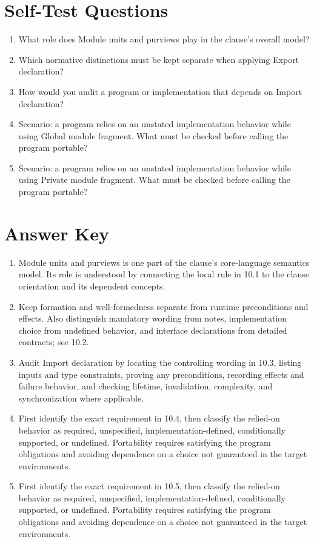 \documentclass[11pt,letterpaper]{article}
\begin{document}
\section{Self-Test Questions}
\begin{enumerate}
\item What role does Module units and purviews play in the clause's overall model?
\item Which normative distinctions must be kept separate when applying Export declaration?
\item How would you audit a program or implementation that depends on Import declaration?
\item Scenario: a program relies on an unstated implementation behavior while using Global module fragment. What must be checked before calling the program portable?
\item Scenario: a program relies on an unstated implementation behavior while using Private module fragment. What must be checked before calling the program portable?
\end{enumerate}
\clearpage\section{Answer Key}
\begin{enumerate}
\item Module units and purviews is one part of the clause's core-language semantics model. Its role is understood by connecting the local rule in 10.1 to the clause orientation and its dependent concepts.
\item Keep formation and well-formedness separate from runtime preconditions and effects. Also distinguish mandatory wording from notes, implementation choice from undefined behavior, and interface declarations from detailed contracts; see 10.2.
\item Audit Import declaration by locating the controlling wording in 10.3, listing inputs and type constraints, proving any preconditions, recording effects and failure behavior, and checking lifetime, invalidation, complexity, and synchronization where applicable.
\item First identify the exact requirement in 10.4, then classify the relied-on behavior as required, unspecified, implementation-defined, conditionally supported, or undefined. Portability requires satisfying the program obligations and avoiding dependence on a choice not guaranteed in the target environments.
\item First identify the exact requirement in 10.5, then classify the relied-on behavior as required, unspecified, implementation-defined, conditionally supported, or undefined. Portability requires satisfying the program obligations and avoiding dependence on a choice not guaranteed in the target environments.
\end{enumerate}
\end{document}
